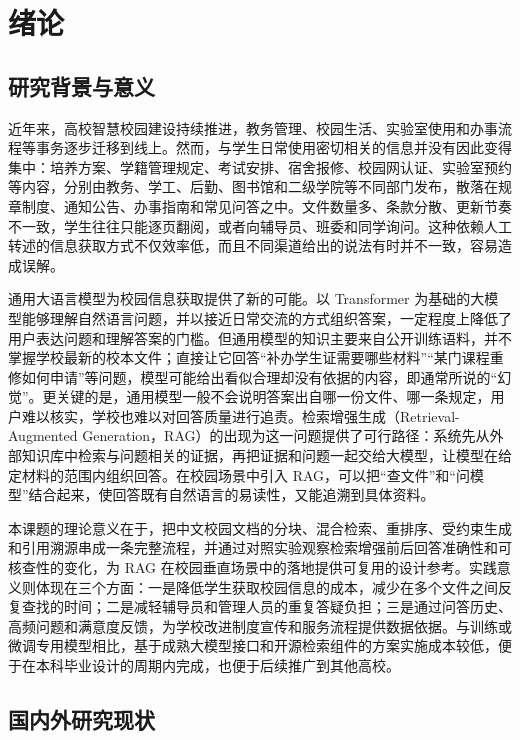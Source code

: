 \chapter{绪论}
\label{chap:intro}

\section{研究背景与意义}
\label{sec:background}

近年来，高校智慧校园建设持续推进，教务管理、校园生活、实验室使用和办事流程等事务逐步迁移到线上。然而，与学生日常使用密切相关的信息并没有因此变得集中：培养方案、学籍管理规定、考试安排、宿舍报修、校园网认证、实验室预约等内容，分别由教务、学工、后勤、图书馆和二级学院等不同部门发布，散落在规章制度、通知公告、办事指南和常见问答之中。文件数量多、条款分散、更新节奏不一致，学生往往只能逐页翻阅，或者向辅导员、班委和同学询问。这种依赖人工转述的信息获取方式不仅效率低，而且不同渠道给出的说法有时并不一致，容易造成误解。

通用大语言模型为校园信息获取提供了新的可能。以 Transformer 为基础的大模型能够理解自然语言问题，并以接近日常交流的方式组织答案，一定程度上降低了用户表达问题和理解答案的门槛。但通用模型的知识主要来自公开训练语料，并不掌握学校最新的校本文件；直接让它回答“补办学生证需要哪些材料”“某门课程重修如何申请”等问题，模型可能给出看似合理却没有依据的内容，即通常所说的“幻觉”。更关键的是，通用模型一般不会说明答案出自哪一份文件、哪一条规定，用户难以核实，学校也难以对回答质量进行追责。检索增强生成（Retrieval-Augmented Generation，RAG）的出现为这一问题提供了可行路径：系统先从外部知识库中检索与问题相关的证据，再把证据和问题一起交给大模型，让模型在给定材料的范围内组织回答。在校园场景中引入 RAG，可以把“查文件”和“问模型”结合起来，使回答既有自然语言的易读性，又能追溯到具体资料。

本课题的理论意义在于，把中文校园文档的分块、混合检索、重排序、受约束生成和引用溯源串成一条完整流程，并通过对照实验观察检索增强前后回答准确性和可核查性的变化，为 RAG 在校园垂直场景中的落地提供可复用的设计参考。实践意义则体现在三个方面：一是降低学生获取校园信息的成本，减少在多个文件之间反复查找的时间；二是减轻辅导员和管理人员的重复答疑负担；三是通过问答历史、高频问题和满意度反馈，为学校改进制度宣传和服务流程提供数据依据。与训练或微调专用模型相比，基于成熟大模型接口和开源检索组件的方案实施成本较低，便于在本科毕业设计的周期内完成，也便于后续推广到其他高校。

\section{国内外研究现状}
\label{sec:related}

